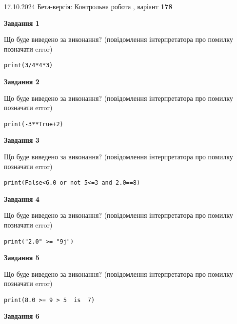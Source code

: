 \documentclass[12pt, ukrainian]{article}
\begin{document}
{\Large{17.10.2024 Бета-версія: Контрольна робота , варіант  \No \textbf { 178 }\par}}
{
\begin {large}
{\begin {center}\textbf{Завдання 1}\end {center}}

Що буде виведено за виконання? (повідомлення інтерпретатора про помилку позначати error)\par
\begin{verbatim}
print(3/4*4*3)
\end{verbatim}

{\begin {center}\textbf{Завдання 2}\end {center}}

Що буде виведено за виконання? (повідомлення інтерпретатора про помилку позначати error)\par
\begin{verbatim}
print(-3**True+2)
\end{verbatim}

{\begin {center}\textbf{Завдання 3}\end {center}}

Що буде виведено за виконання? (повідомлення інтерпретатора про помилку позначати error)\par
\begin{verbatim}
print(False<6.0 or not 5<=3 and 2.0==8)
\end{verbatim}

{\begin {center}\textbf{Завдання 4}\end {center}}

Що буде виведено за виконання? (повідомлення інтерпретатора про помилку позначати error)\par
\begin{verbatim}
print("2.0" >= "9j")
\end{verbatim}

{\begin {center}\textbf{Завдання 5}\end {center}}

Що буде виведено за виконання? (повідомлення інтерпретатора про помилку позначати error)\par
\begin{verbatim}
print(8.0 >= 9 > 5  is  7)
\end{verbatim}

{\begin {center}\textbf{Завдання 6}\end {center}}


\end{large}}
\end{document}
